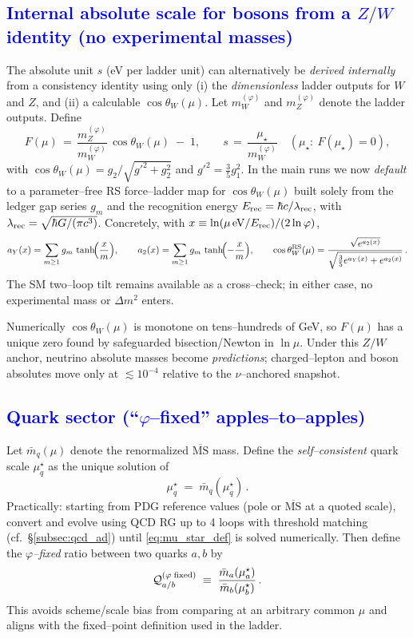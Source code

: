 \documentclass[%
 amsmath,amssymb,
 aps,
prb,
floatfix, showkeys
]{revtex4-2}
\newcommand{\modif}[1]{\textcolor{blue}{#1}}
\begin{document}
{\modif{
\subsection{Internal absolute scale for bosons from a $Z/W$ identity (no experimental masses)}
\label{subsec:ZW-anchor}
}}
The absolute unit $s$ (eV per ladder unit) can alternatively be \emph{derived internally} from a consistency identity using only (i) the \emph{dimensionless} ladder outputs for $W$ and $Z$, and (ii) a calculable $\cos\theta_W(\mu)$.
Let $m_W^{(\varphi)}$ and $m_Z^{(\varphi)}$ denote the ladder outputs. Define
\[
  F(\mu) \,=\, \frac{m_Z^{(\varphi)}}{m_W^{(\varphi)}}\,\cos\theta_W(\mu)\; -\; 1,\qquad
  s \,=\, \frac{\mu_\star}{m_W^{(\varphi)}}\quad(\mu_\star:\ F(\mu_\star)=0),
\]
with $\cos\theta_W(\mu)=g_2/\sqrt{g'^2+g_2^2}$ and $g'^2=\tfrac{3}{5}g_1^2$.
In the main runs we now \emph{default} to a parameter--free RS force--ladder map for $\cos\theta_W(\mu)$ built solely from the ledger gap series $g_m$ and the recognition energy $E_{\rm rec}=\hbar c/\lambda_{\rm rec}$, with $\lambda_{\rm rec}=\sqrt{\hbar G/(\pi c^3)}$. Concretely, with $x\equiv \ln(\mu\,\mathrm{eV}/E_{\rm rec})/(2\ln\varphi)$,
\[
  a_Y(x)=\sum_{m\ge1} g_m\,\tanh\!\Bigl(\frac{x}{m}\Bigr),\qquad
  a_2(x)=\sum_{m\ge1} g_m\,\tanh\!\Bigl(-\frac{x}{m}\Bigr),\qquad
  \cos\theta_W^{\rm RS}(\mu)=\frac{\sqrt{e^{a_2(x)}}}{\sqrt{\tfrac{3}{5}e^{a_Y(x)}+e^{a_2(x)}}}\,.
\]
The SM two--loop tilt remains available as a cross--check; in either case, no experimental mass or $\Delta m^2$ enters.

Numerically $\cos\theta_W(\mu)$ is monotone on tens–hundreds of GeV, so $F(\mu)$ has a unique zero found by safeguarded bisection/Newton in $\ln\mu$. Under this $Z/W$ anchor, neutrino absolute masses become \emph{predictions}; charged--lepton and boson absolutes move only at $\lesssim10^{-4}$ relative to the $\nu$--anchored snapshot.




{\modif{
    \subsection{Quark sector (``$\varphi$--fixed'' apples--to--apples)}
}}
Let $\bar m_q(\mu)$ denote the renormalized $\overline{\mathrm{MS}}$ mass.
Define the \emph{self--consistent} quark scale $\mu^\star_q$ as the unique solution of
\begin{equation}
  \mu^\star_q \;=\; \bar m_q(\mu^\star_q)\,.
  \label{eq:mu_star_def}
\end{equation}
Practically: starting from PDG reference values (pole or $\overline{\mathrm{MS}}$ at a quoted scale), convert and evolve using QCD RG up to 4 loops with threshold matching (cf.\ \S\ref{subsec:qcd_ad}) until \eqref{eq:mu_star_def} is solved numerically. Then define the \emph{$\varphi$--fixed} ratio between two quarks $a,b$ by
\begin{equation}
  \mathcal{Q}_{a/b}^{(\varphi{\rm\;fixed})}
  \;\equiv\; \frac{\bar m_a(\mu^\star_a)}{\bar m_b(\mu^\star_b)}\,.
  \label{eq:phi_fixed_ratio}
\end{equation}
This avoids scheme/scale bias from comparing at an arbitrary common $\mu$ and aligns with the fixed--point definition used in the ladder.
\end{document}
